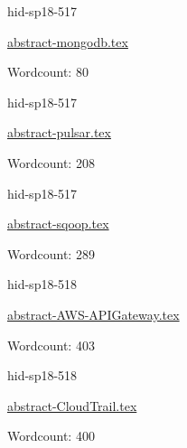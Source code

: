 

\begin{IU}

hid-sp18-517

\href{https://github.com/cloudmesh-community/hid-sp18-517/blob/master//technology/abstract-mongodb.tex}{abstract-mongodb.tex}

 

Wordcount: 80

\end{IU}



\begin{IU}

hid-sp18-517

\href{https://github.com/cloudmesh-community/hid-sp18-517/blob/master//technology/abstract-pulsar.tex}{abstract-pulsar.tex}

 

Wordcount: 208

\end{IU}



\begin{IU}

hid-sp18-517

\href{https://github.com/cloudmesh-community/hid-sp18-517/blob/master//technology/abstract-sqoop.tex}{abstract-sqoop.tex}

 

Wordcount: 289

\end{IU}



\begin{IU}

hid-sp18-518

\href{https://github.com/cloudmesh-community/hid-sp18-518/blob/master//technology/abstract-AWS-APIGateway.tex}{abstract-AWS-APIGateway.tex}

 

Wordcount: 403

\end{IU}



\begin{IU}

hid-sp18-518

\href{https://github.com/cloudmesh-community/hid-sp18-518/blob/master//technology/abstract-CloudTrail.tex}{abstract-CloudTrail.tex}

 

Wordcount: 400

\end{IU}

